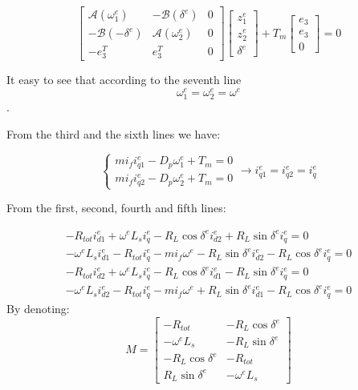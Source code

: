 \documentclass[letterpaper, 10 pt, conference]{ieeeconf}  %
\begin{document}
\begin{equation}
\left[\begin{array}{c|c|c}
\mathcal{A}(\omega_{1}^{e}) & -\mathcal{B}(\delta^{e}) & 0\\
\hline -\mathcal{B}(-\delta^{e}) & \mathcal{A}(\omega_{2}^{e}) & 0\\
\hline -e_{3}^{T} & e_{3}^{T} & 0
\end{array}\right]\left[\begin{array}{c}
z_{1}^{e}\\
z_{2}^{e}\\
\delta^{e}
\end{array}\right]+T_{m}\left[\begin{array}{c}
e_{3}\\
e_{3}\\
0
\end{array}\right]=0
\label{eq:algebricEquation}
\end{equation}

It easy to see that according to the seventh line $$\omega_{1}^{e}=\omega_{2}^{e}=\omega^{e}$$.

From the third and the sixth lines we have: 

$$
\left\{ \begin{array}{c}
mi_{f}i_{q1}^{e}-D_{p}\omega_{1}^{e}+T_{m}=0\\
mi_{f}i_{q2}^{e}-D_{p}\omega_{2}^{e}+T_{m}=0
\end{array}\right.\longrightarrow i_{q1}^{e}=i_{q2}^{e}=i_{q}^{e}
$$

From the first, second, fourth and fifth lines:

$$
 \begin{array}{c}
-R_{tot}i_{d1}^{e}+\omega^{e}L_{s}i_{q}^{e}-R_{L}\cos\delta^{e}i_{d2}^{e}+R_{L}\sin\delta^{e}i_{q}^{e}=0\\
-\omega^{e}L_{s}i_{d1}^{e}-R_{tot}i_{q}^{e}-mi_{f}\omega^{e}-R_{L}\sin\delta^{e}i_{d2}^{e}-R_{L}\cos\delta^{e}i_{q}^{e}=0\\
-R_{tot}i_{d2}^{e}+\omega^{e}L_{s}i_{q}^{e}-R_{L}\cos\delta^{e}i_{d1}^{e}-R_{L}\sin\delta^{e}i_{q}^{e}=0\\
-\omega^{e}L_{s}i_{d2}^{e}-R_{tot}i_{q}^{e}-mi_{f}\omega^{e}+R_{L}\sin\delta^{e}i_{d1}^{e}-R_{L}\cos\delta^{e}i_{q}^{e}=0
\end{array}
$$
By denoting:
\[
M=\left[\begin{array}{cc}
-R_{tot} & -R_{L}\cos\delta^{e}\\
-\omega^{e}L_{s} & -R_{L}\sin\delta^{e}\\
-R_{L}\cos\delta^{e} & -R_{tot}\\
R_{L}\sin\delta^{e} & -\omega^{e}L_{s}
\end{array}\right]
\]
\end{document}

